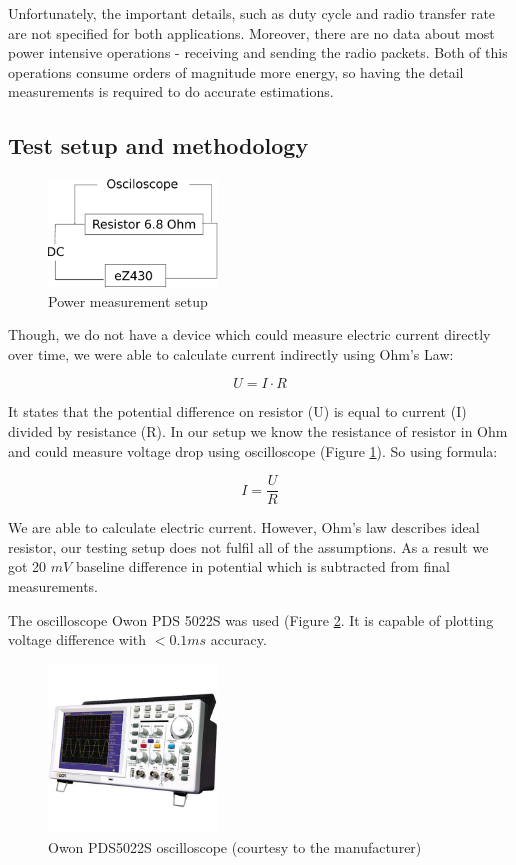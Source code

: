 Unfortunately, the important details, such as duty cycle and radio transfer rate are not specified for both applications.
Moreover, there are no data about most power intensive operations - receiving and sending the radio packets.
Both of this operations consume orders of magnitude more energy, so having the detail measurements is required to do accurate estimations.

\subsection{Test setup and methodology}

\begin{figure}[h]
  \centering
  \includegraphics[width=0.4\textwidth]{diagrams/power.eps}
  \caption{Power measurement setup}
  \label{fig:power}
\end{figure}

Though, we do not have a device which could measure electric current directly over time, we were able to calculate current indirectly using Ohm's Law: 

$$
U = I \cdot R
$$

It states that the potential difference on resistor (U) is equal to current (I) divided by resistance (R).
In our setup we know the resistance of resistor in Ohm and could measure voltage drop using oscilloscope (Figure \ref{fig:power}).
So using formula:

$$
I = \frac{U}{R}
$$

We are able to calculate electric current.
However, Ohm's law describes ideal resistor, our testing setup does not fulfil all of the assumptions.
As a result we got 20 $mV$ baseline difference in potential which is subtracted from final measurements.

The oscilloscope Owon PDS 5022S was used (Figure \ref{fig:owon}.
It is capable of plotting voltage difference with $< 0.1 ms$ accuracy.

\begin{figure}[h]
  \centering
  \includegraphics[width=0.4\textwidth]{img/owon_pds5022s.jpg}
  \caption{Owon PDS5022S oscilloscope (courtesy to the manufacturer)}
  \label{fig:owon}
\end{figure}


